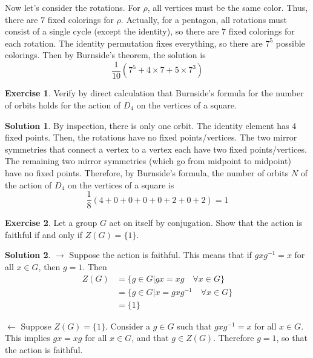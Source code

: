 \documentclass[12pt]{article}
\theoremstyle{definition}
\newtheorem{exercise}{\color{YellowOrange}Exercise}
\theoremstyle{definition}
\newtheorem{solution}{\color{Goldenrod}Solution}
\begin{document}
Now let's consider the rotations. For $\rho$, all vertices must be the same color. Thus, there are $7$ fixed colorings for $\rho$. Actually, for a pentagon, all rotations must consist of a single cycle (except the identity), so there are $7$ fixed colorings for each rotation. The identity permutation fixes everything, so there are $7^5$ possible colorings. Then by Burnside's theorem, the solution is
\begin{equation}
	\frac{1}{10}(7^5 + 4 \times 7 + 5 \times 7^3)
\end{equation}

\begin{exercise}
	Verify by direct calculation that Burnside's formula for the number of orbits holds for the action of $D_4$ on the vertices of a square.
\end{exercise}
\begin{solution}
	By inspection, there is only one orbit. The identity element has $4$ fixed points. Then, the rotations have no fixed points/vertices. The two mirror symmetries that connect a vertex to a vertex each have two fixed points/vertices. The remaining two mirror symmetries (which go from midpoint to midpoint) have no fixed points. Therefore, by Burnside's formula, the number of orbits $N$ of the action of $D_4$ on the vertices of a square is
	\begin{equation}
		\frac{1}{8}(4 + 0 + 0 + 0 + 0 + 2 + 0 + 2) = 1
	\end{equation}
\end{solution}

\begin{exercise}
	Let a group $G$ act on itself by conjugation. Show that the action is faithful if and only if $Z(G) = \{1\}$.
\end{exercise}
\begin{solution}
	$\rightarrow$ Suppose the action is faithful. This means that if $gxg^{-1} = x$ for all $x \in G$, then $g = 1$. Then
	\begin{align*}
		Z(G) &= \{ g \in G | gx = xg \quad \forall x\in G \} \\
		&= \{ g \in G | x = gxg^{-1} \quad \forall x\in G \} \\
		&= \{1 \} \tag{since the action is faithful}
	\end{align*}

	$\leftarrow$ Suppose $Z(G) = \{1\}$. Consider a $g \in G$ such that $gxg^{-1} = x$ for all $x \in G$. This implies $gx = xg$ for all $x \in G$, and that $g \in Z(G)$. Therefore $g = 1$, so that the action is faithful. 
\end{solution}
\end{document}
